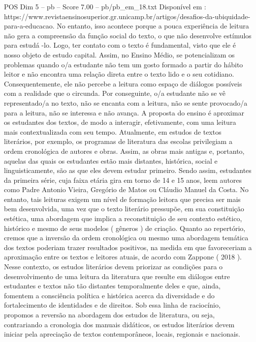 \begin{textsample}{POS Dim 5 – pb – Score 7.00 – pb/pb\_em\_18.txt}
Disponível em : https://www.revistaensinosuperior.gr.unicamp.br/artigos/desafios-da-ubiquidade-para-a-educacao.
No entanto, isso acontece porque a pouca experiência de leitura não gera a compreensão da função social do texto, o que não desenvolve estímulos para estudá -lo.
Logo, ter contato com o texto é fundamental, visto que ele é nosso objeto de estudo capital.
Assim, no Ensino Médio, se potencializam os problemas quando o/a estudante não tem um gosto formado a partir do hábito leitor e não encontra uma relação direta entre o texto lido e o seu cotidiano.
Consequentemente, ele não percebe a leitura como espaço de diálogos possíveis com a realidade que o circunda.
Por conseguinte, o/a estudante não se vê representado/a no texto, não se encanta com a leitura, não se sente provocado/a para a leitura, não se interessa e não avança.
A proposta do ensino é aproximar os estudantes dos textos, de modo a interagir, efetivamente, com uma leitura mais contextualizada com seu tempo.
Atualmente, em estudos de textos literários, por exemplo, os programas de literatura das escolas privilegiam a ordem cronológica de autores e obras.
Assim, as obras mais antigas e, portanto, aquelas das quais os estudantes estão mais distantes, histórica, social e linguisticamente, são as que eles devem estudar primeiro.
Sendo assim, estudantes da primeira série, cuja faixa etária gira em torno de 14 e 15 anos, leem autores como Padre Antonio Vieira, Gregório de Matos ou Cláudio Manuel da Costa.
No entanto, tais leituras exigem um nível de formação leitora que precisa ser mais bem desenvolvida, uma vez que o texto literário pressupõe, em sua constituição estética, uma abordagem que implica a reconstituição de seu contexto estético, histórico e mesmo de seus modelos ( gêneros ) de criação.
Quanto ao repertório, cremos que a inversão da ordem cronológica ou mesmo uma abordagem temática dos textos poderiam trazer resultados positivos, na medida em que favoreceriam a aproximação entre os textos e leitores atuais, de acordo com Zappone ( 2018 ).
Nesse contexto, os estudos literários devem priorizar as condições para o desenvolvimento de uma leitura da literatura que resulte em diálogos entre estudantes e textos não tão distantes temporalmente deles e que, ainda, fomentem a consciência política e histórica acerca da diversidade e do fortalecimento de identidades e de direitos.
Sob essa linha de raciocínio, propomos a reversão na abordagem dos estudos de literatura, ou seja, contrariando a cronologia dos manuais didáticos, os estudos literários devem iniciar pela apreciação de textos contemporâneos, locais, regionais e nacionais.

\end{textsample}
